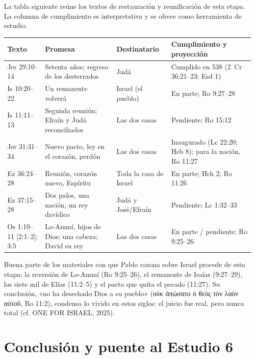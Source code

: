 \documentclass[11pt,letterpaper]{article}
\newcommand{\grc}[1]{\foreignlanguage{ancientgreek}{#1}}
\begin{document}
La tabla siguiente reúne los textos de restauración y reunificación de esta etapa. La columna de cumplimiento es interpretativa y se ofrece como herramienta de estudio.

\begin{table}[!htbp]\centering\footnotesize
\renewcommand{\arraystretch}{1.12}
\begin{tabular}{>{\RaggedRight\arraybackslash}p{2.5cm}>{\RaggedRight\arraybackslash}p{4.6cm}>{\RaggedRight\arraybackslash}p{2.2cm}>{\RaggedRight\arraybackslash}p{4.8cm}}
\toprule
\textbf{Texto} & \textbf{Promesa} & \textbf{Destinatario} & \textbf{Cumplimiento y proyección}\\
\midrule
Jer 29:10--14 & Setenta años; regreso de los desterrados & Judá & Cumplido en 538 (2~Cr 36:21--23; Esd 1)\\
Is 10:20--22 & Un remanente volverá & Israel (el pueblo) & En parte; Ro 9:27--28\\
Is 11:11--13 & Segunda reunión; Efraín y Judá reconciliados & Las dos casas & Pendiente; Ro 15:12\\
Jer 31:31--34 & Nuevo pacto, ley en el corazón, perdón & Las dos casas & Inaugurado (Lc 22:20; Heb 8); para la nación, Ro 11:27\\
Ez 36:24--28 & Reunión, corazón nuevo, Espíritu & Toda la casa de Israel & En parte; Hch 2; Ro 11:26\\
Ez 37:15--28 & Dos palos, una nación, un rey davídico & Judá y José/Efraín & Pendiente; Lc 1:32--33\\
Os 1:10--11 [2:1--2]; 3:5 & Lo-Ammí, hijos de Dios; una cabeza; David su rey & Las dos casas & En parte / pendiente; Ro 9:25--26\\
\bottomrule
\end{tabular}\end{table}

Buena parte de los materiales con que Pablo razona sobre Israel procede de esta etapa: la reversión de Lo-Ammí (Ro 9:25--26), el remanente de Isaías (9:27--29), los siete mil de Elías (11:2--5) y el pacto que quita el pecado (11:27). Su conclusión, «no ha desechado Dios a su pueblo» (\grc{οὐκ ἀπώσατο ὁ θεὸς τὸν λαὸν αὐτοῦ}, Ro 11:2), condensa lo vivido en estos siglos: el juicio fue real, pero nunca total (cf. ONE FOR ISRAEL, 2025).

\section{Conclusión y puente al Estudio 6}
\end{document}
